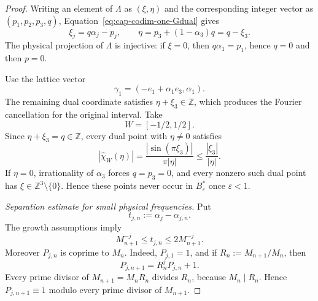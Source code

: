 \documentclass[11pt,reqno,a4paper]{amsart}
\numberwithin{equation}{section}
\theoremstyle{compact}
\theoremstyle{definition}
\theoremstyle{definition}
\begin{document}
\begin{proof}
Writing an element of $\Lambda$ as $(\xi,\eta)$ and the corresponding integer
vector as $(p_1,p_2,p_3,q)$, Equation~\eqref{eq:cap-codim-one-Gdual} gives
\begin{equation}\label{eq:cap-codim-one-dual-coordinates}
  \xi_j=q\alpha_j-p_j,
  \qquad
  \eta=p_3+(1-\alpha_3)q=q-\xi_3.
\end{equation}
The physical projection of $\Lambda$ is injective: if $\xi=0$, then
$q\alpha_1=p_1$, hence $q=0$ and then $p=0$.

Use the lattice vector
\begin{equation}\label{eq:cap-codim-one-primal-vectors}
  \gamma_1=(-e_1+\alpha_1e_3,\alpha_1).
\end{equation}
The remaining dual coordinate satisfies $\eta+\xi_3\in\mathbb Z$, which
produces the Fourier cancellation for the original interval.  Take
\begin{equation}\label{eq:cap-codim-one-window}
  W=[-1/2,1/2].
\end{equation}
Since $\eta+\xi_3=q\in\mathbb Z$, every dual point with $\eta\neq0$
satisfies
\begin{equation}\label{eq:cap-codim-one-window-cancellation}
  |\widehat{\chi}_W(\eta)|
  =\frac{|\sin(\pi\xi_3)|}{\pi|\eta|}
  \leq\frac{|\xi_3|}{|\eta|}.
\end{equation}
If $\eta=0$, irrationality of $\alpha_3$ forces $q=p_3=0$, and every
nonzero such dual point has $\xi\in\mathbb Z^3\setminus\{0\}$.  Hence these
points never occur in $B_\varepsilon^*$ once $\varepsilon<1$.

\smallskip\noindent\emph{Separation estimate for small physical frequencies.}
Put
\begin{equation}\label{eq:cap-codim-one-tails}
  t_{j,n}:=\alpha_j-\alpha_{j,n}.
\end{equation}
The growth assumptions imply
\begin{equation}\label{eq:cap-codim-one-tail-bounds}
  M_{n+1}^{-j}\leq t_{j,n}\leq2M_{n+1}^{-j}.
\end{equation}
Moreover $P_{j,n}$ is coprime to $M_n$.  Indeed, $P_{j,1}=1$, and if
$R_n:=M_{n+1}/M_n$, then
\begin{equation}\label{eq:cap-codim-one-prefix-recurrence}
  P_{j,n+1}=R_n^jP_{j,n}+1.
\end{equation}
Every prime divisor of $M_{n+1}=M_nR_n$ divides $R_n$, because
$M_n\mid R_n$.  Hence $P_{j,n+1}\equiv1$ modulo every prime divisor of
$M_{n+1}$.


\end{proof}
\end{document}
